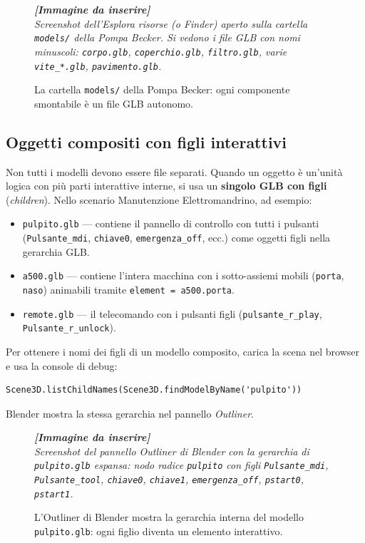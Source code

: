 ﻿\documentclass[a4paper,12pt,oneside]{book}
\newcommand{\kw}[1]{\texttt{\color{keycolor}#1}}
\newcommand{\file}[1]{\texttt{#1}}
\newcommand{\imgph}[2]{%
  \begin{tcolorbox}[colback=cvtlightblue!30,colframe=cvtblue!40,%
    width=#1,halign=center,valign=center,height=5cm,boxrule=0.5pt,arc=3pt]%
    \textcolor{cvtgray}{\itshape\footnotesize\textbf{[Immagine da inserire]}\\[3pt]#2}%
  \end{tcolorbox}}
\begin{document}
\begin{figure}[H]
  \centering
  \imgph{11cm}{Screenshot dell'Esplora risorse (o Finder) aperto sulla cartella \file{models/} della Pompa Becker. Si vedono i file GLB con nomi minuscoli: \file{corpo.glb}, \file{coperchio.glb}, \file{filtro.glb}, varie \file{vite\_*.glb}, \file{pavimento.glb}.}
  \caption{La cartella \file{models/} della Pompa Becker: ogni componente smontabile è un file GLB autonomo.}
  \label{fig:cartella-models}
\end{figure}

\subsection{Oggetti compositi con figli interattivi}

Non tutti i modelli devono essere file separati. Quando un oggetto è
un'unità logica con più parti interattive interne, si usa un
\textbf{singolo GLB con figli} (\emph{children}). Nello scenario
Manutenzione Elettromandrino, ad esempio:

\begin{itemize}
  \item \file{pulpito.glb} --- contiene il pannello di controllo con
        tutti i pulsanti (\texttt{Pulsante\_mdi}, \texttt{chiave0},
        \texttt{emergenza\_off}, ecc.) come oggetti figli nella gerarchia
        GLB.
  \item \file{a500.glb} --- contiene l'intera macchina con i
        sotto-assiemi mobili (\texttt{porta}, \texttt{naso}) animabili
        tramite \kw{element = a500.porta}.
  \item \file{remote.glb} --- il telecomando con i pulsanti figli
        (\texttt{pulsante\_r\_play}, \texttt{Pulsante\_r\_unlock}).
\end{itemize}

\begin{notablu}
Per ottenere i nomi dei figli di un modello composito, carica la scena
nel browser e usa la console di debug:
\begin{lstlisting}
Scene3D.listChildNames(Scene3D.findModelByName('pulpito'))
\end{lstlisting}
Blender mostra la stessa gerarchia nel pannello \emph{Outliner}.
\end{notablu}

\begin{figure}[H]
  \centering
  \imgph{11cm}{Screenshot del pannello \emph{Outliner} di Blender con la gerarchia di \file{pulpito.glb} espansa: nodo radice \texttt{pulpito} con figli \texttt{Pulsante\_mdi}, \texttt{Pulsante\_tool}, \texttt{chiave0}, \texttt{chiave1}, \texttt{emergenza\_off}, \texttt{pstart0}, \texttt{pstart1}.}
  \caption{L'Outliner di Blender mostra la gerarchia interna del modello \file{pulpito.glb}: ogni figlio diventa un elemento interattivo.}
  \label{fig:blender-outliner}
\end{figure}
\end{document}
